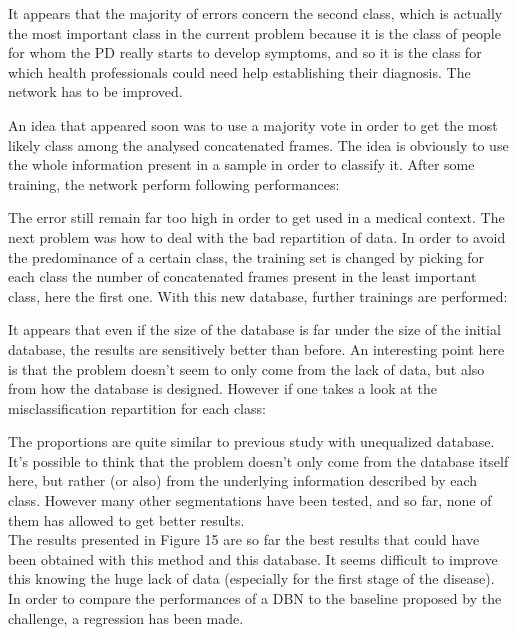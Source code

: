 \documentclass{report}
\begin{document}
		 
		 It appears that the majority of errors concern the second class, which is actually the most important class in the current problem because it is the class of people for whom the PD really starts to develop symptoms, and so it is the class for which health professionals could need help establishing their diagnosis. The network has to be improved.
		 
		 An idea that appeared soon was to use a majority vote in order to get the most likely class among the analysed concatenated frames. The idea is obviously to use the whole information present in a sample in order to classify it. After some training, the network perform following performances:
		 
		 
		 The error still remain far too high in order to get used in a medical context. The next problem was how to deal with the bad repartition of data. In order to avoid the predominance of a certain class, the training set is changed by picking for each class the number of concatenated frames present in the least important class, here the first one. With this new database, further trainings are performed:
		 
		 
		 It appears that even if the size of the database is far under the size of the initial database, the results are sensitively better than before. An interesting point here is that the problem doesn't seem to only come from the lack of data, but also from how the database is designed. However if one takes a look at the misclassification repartition for each class:
		 
		 
		 The proportions are quite similar to previous study with unequalized database. It's possible to think that the problem doesn't only come from the database itself here, but rather (or also) from the underlying information described by each class. However many other segmentations have been tested, and so far, none of them has allowed to get better results. \\
		 
		 The results presented in Figure 15 are so far the best results that could have been obtained with this method and this database. It seems difficult to improve this knowing the huge lack of data (especially for the first stage of the disease). In order to compare the performances of a DBN to the baseline proposed by the challenge, a regression has been made.\\
		 
\end{document}
